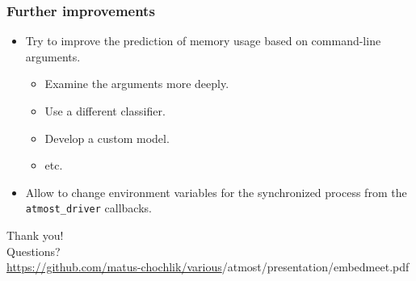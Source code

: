 \documentclass[compress,table,xcolor=table]{beamer}
\newcommand{\shelltext}[1]{\texttt{\colorbox{light-gray}{#1}}}
\begin{document}
\begin{frame}
  \frametitle{Further improvements}
  \begin{itemize}
    \Large
    \item Try to improve the prediction of memory usage based on command-line
      arguments.
    \begin{itemize}
      \item Examine the arguments more deeply.
      \item Use a different classifier.
      \item Develop a custom model.
      \item etc.
    \end{itemize}
    \item Allow to change environment variables for the synchronized process
      from the \shelltext{atmost\_driver} callbacks.
  \end{itemize}
\end{frame}
\begin{frame}
  \centering
  \Huge
  Thank you!\\Questions?\\
  \vfill
  \Large
  \url{https://github.com/matus-chochlik/various}/atmost/presentation/embedmeet.pdf
\end{frame}
\end{document}
